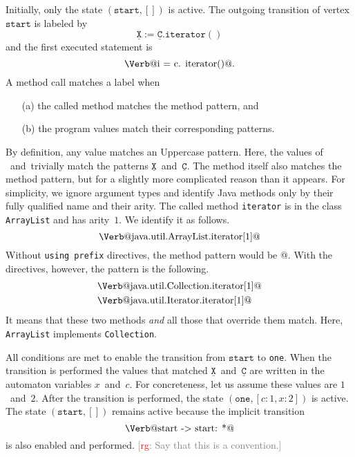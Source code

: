 \documentclass[preprint]{sigplanconf} %
\makeatletter
\newcommand{\note}[2]{\textcolor{gray}{[\textcolor{red}{#1}: #2]}}
\newcommand{\rg}[1]{\note{rg}{#1}}
\newcommand{\pattern}[1]{\ensuremath{\mathtt{\underline{#1}}}}
\newcommand{\start}{\ensuremath{\mathtt{start}}\xspace}
\newcommand{\verbline}[2][]{\[\text{\Verb@#2@}#1\]}
\theoremstyle{definition}
\theoremstyle{remark}
\makeatother
\begin{document}
Initially, only the state $(\start,[])$ is active.
The outgoing transition of vertex \start is labeled by \[\pattern X:=\pattern{C}.\mathtt{iterator}()\] and the first executed statement is \verbline[.]{i = c.\PY{n+na}{iterator}()}
A method call matches a label when
\begin{itemize}
\item[(a)] the called method matches the method pattern, and
\item[(b)] the program values match their corresponding patterns.
\end{itemize}
By definition, any value matches an Uppercase pattern.
Here, the values of \Verb@i@~and~\Verb@c@ trivially match the patterns \pattern X~and~\pattern C.
The method itself also matches the method pattern, but for a slightly more complicated reason than it appears.
For simplicity, we ignore argument types and identify Java methods only by their fully qualified name and their arity.
The called method \texttt{iterator} is in the class \texttt{ArrayList} and has arity~$1$.
We identify it as follows.
\verbline{java.util.ArrayList.iterator[1]}
Without \texttt{using prefix} directives, the method pattern would be \Verb@iterator[1]@.
With the directives, however, the pattern is the following.
\begin{align*}
&\text{\Verb@java.util.Collection.iterator[1]@} \\
&\text{\Verb@java.util.Iterator.iterator[1]@}
\end{align*}
It means that these two methods \emph{and} all those that override them match.
Here, \texttt{ArrayList} implements \texttt{Collection}.

All conditions are met to enable the transition from \start to \texttt{one}.
When the transition is performed the values that matched \pattern X~and~\pattern C are written in the automaton variables $x$~and~$c$.
For concreteness, let us assume these values are $1$~and~$2$.
After the transition is performed, the state $(\mathtt{one},[c:1,x:2])$ is active.
The state $(\start,[])$ remains active because the implicit transition \verbline{start -> start: *} is also enabled and performed.
\rg{Say that this is a convention.}
\end{document}

